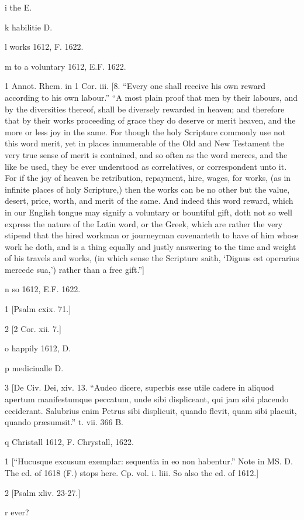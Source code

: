 i
the E.

k
habilitie D.

l
works 1612, F. 1622.

m
to a voluntary 1612, E.F. 1622.

1
Annot. Rhem. in 1 Cor. iii. [8. “Every one shall receive his own reward according to his own labour.” “A most plain proof that men by their labours, and by the diversities thereof, shall be diversely rewarded in heaven; and therefore that by their works proceeding of grace they do deserve or merit heaven, and the more or less joy in the same. For though the holy Scripture commonly use not this word merit, yet in places innumerable of the Old and New Testament the very true sense of merit is contained, and so often as the word merces, and the like be used, they be ever understood as correlatives, or correspondent unto it. For if the joy of heaven be retribution, repayment, hire, wages, for works, (as in infinite places of holy Scripture,) then the works can be no other but the value, desert, price, worth, and merit of the same. And indeed this word reward, which in our English tongue may signify a voluntary or bountiful gift, doth not so well express the nature of the Latin word, or the Greek, which are rather the very stipend that the hired workman or journeyman covenanteth to have of him whose work he doth, and is a thing equally and justly answering to the time and weight of his travels and works, (in which sense the Scripture saith, ‘Dignus est operarius mercede sua,’) rather than a free gift.”]

n
so 1612, E.F. 1622.

1
[Psalm cxix. 71.]

2
[2 Cor. xii. 7.]

o
happily 1612, D.

p
medicinalle D.

3
[De Civ. Dei, xiv. 13. “Audeo dicere, superbis esse utile cadere in aliquod apertum manifestumque peccatum, unde sibi displiceant, qui jam sibi placendo ceciderant. Salubrius enim Petrus sibi displicuit, quando flevit, quam sibi placuit, quando præsumsit.” t. vii. 366 B.

q
Christall 1612, F. Chrystall, 1622.

1
[“Hucusque excusum exemplar: sequentia in eo non habentur.” Note in MS. D. The ed. of 1618 (F.) stops here. Cp. vol. i. liii. So also the ed. of 1612.]

2
[Psalm xliv. 23-27.]

r
ever?

